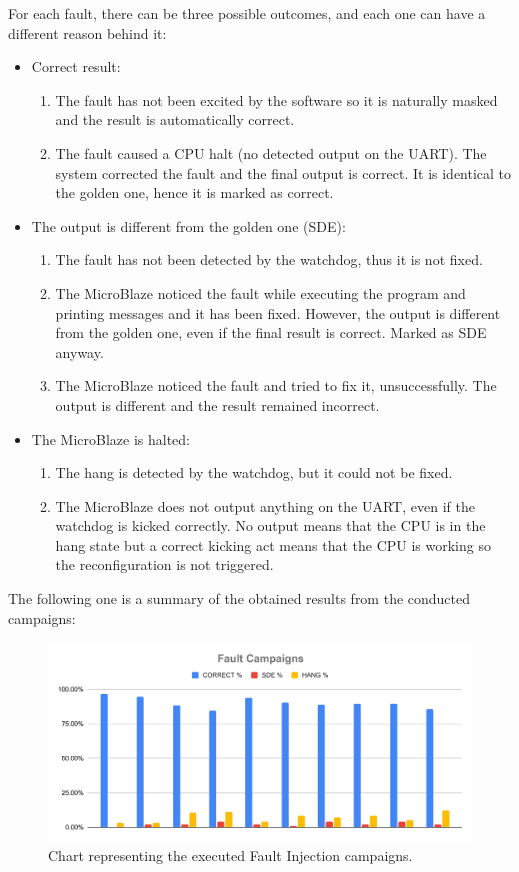 For each fault, there can be three possible outcomes, and each one can have a different reason behind it:
\begin{itemize}
    \item Correct result:
    \begin{enumerate}
        \item The fault has not been excited by the software so it is naturally masked and the result is automatically correct.
        \item The fault caused a CPU halt (no detected output on the UART). The system corrected the fault and the final output is correct. It is identical to the golden one, hence it is marked as correct.
    \end{enumerate}
    \item The output is different from the golden one (SDE):
    \begin{enumerate}
        \item The fault has not been detected by the watchdog, thus it is not fixed.
        \item The MicroBlaze noticed the fault while executing the program and printing messages and it has been fixed. However, the output is different from the golden one, even if the final result is correct. Marked as SDE anyway.
        \item The MicroBlaze noticed the fault and tried to fix it, unsuccessfully. The output is different and the result remained incorrect.
    \end{enumerate}
    \item The MicroBlaze is halted:
    \begin{enumerate}
        \item The hang is detected by the watchdog, but it could not be fixed.
        \item The MicroBlaze does not output anything on the UART, even if the watchdog is kicked correctly. No output means that the CPU is in the hang state but a correct kicking act means that the CPU is working so the reconfiguration is not triggered.
    \end{enumerate}
\end{itemize}

\newpage
The following one is a summary of the obtained results from the conducted campaigns:

\begin{figure}[H]
\centering
\includegraphics[width=0.95\linewidth]{images/chapter5/mchart.pdf}
\caption{Chart representing the executed Fault Injection campaigns.}
\end{figure}

